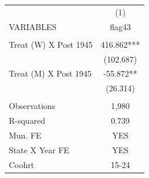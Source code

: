 \begin{tabular}{lc} \hline
 & (1) \\
VARIABLES & flag43 \\ \hline
 &  \\
Treat (W) X Post 1945 & 416.862*** \\
 & (102.687) \\
Treat (M) X Post 1945 & -55.872** \\
 & (26.314) \\
 &  \\
Observations & 1,980 \\
R-squared & 0.739 \\
Mun. FE & YES \\
State X Year FE & YES \\
 Coohrt & 15-24 \\ \hline
\end{tabular}
